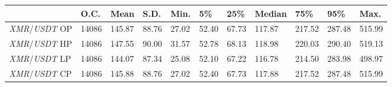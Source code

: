 \begin{tabular}{lllllllllll}
\toprule
 & \textbf{O.C.} & \textbf{Mean} & \textbf{S.D.} & \textbf{Min.} & \textbf{5\%} & \textbf{25\%} & \textbf{Median} & \textbf{75\%} & \textbf{95\%} & \textbf{Max.} \\
\midrule
\emph{XMR}/\emph{USDT} OP & 14086 & 145.87 & 88.76 & 27.02 & 52.40 & 67.73 & 117.87 & 217.52 & 287.48 & 515.99 \\
\emph{XMR}/\emph{USDT} HP & 14086 & 147.55 & 90.00 & 31.57 & 52.78 & 68.13 & 118.98 & 220.03 & 290.40 & 519.13 \\
\emph{XMR}/\emph{USDT} LP & 14086 & 144.07 & 87.34 & 25.08 & 52.10 & 67.22 & 116.78 & 214.50 & 283.98 & 498.97 \\
\emph{XMR}/\emph{USDT} CP & 14086 & 145.88 & 88.76 & 27.02 & 52.40 & 67.73 & 117.88 & 217.52 & 287.48 & 515.99 \\
\bottomrule
\end{tabular}
